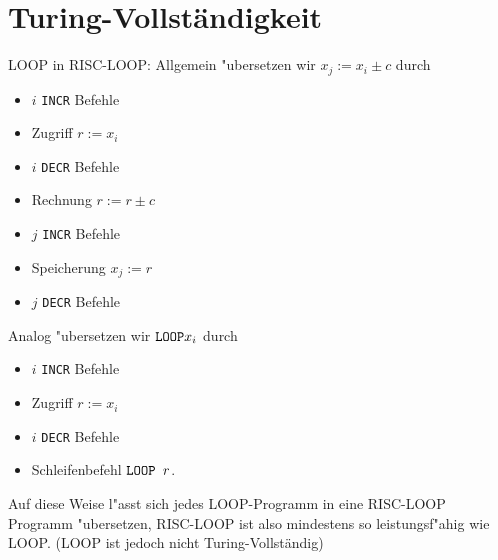 \section*{Turing-Vollständigkeit}
LOOP in RISC-LOOP: Allgemein "ubersetzen wir $x_j:=x_i\pm c$ durch
\begin{itemize}
\item $i$ {\tt INCR} Befehle
\item Zugriff $r:=x_i$
\item $i$ {\tt DECR} Befehle
\item Rechnung $r:=r\pm c$
\item $j$ {\tt INCR} Befehle

\item Speicherung $x_j:=r$
\item $j$ {\tt DECR} Befehle
\end{itemize}
Analog "ubersetzen wir $\text{\tt LOOP} x_i$ durch
\begin{itemize}
\item $i$ {\tt INCR} Befehle
\item Zugriff $r:=x_i$
\item $i$ {\tt DECR} Befehle
\item Schleifenbefehl $\text{\tt LOOP }r$.
\end{itemize}
Auf diese Weise l"asst sich jedes LOOP-Programm in eine RISC-LOOP Programm
"ubersetzen, RISC-LOOP ist also mindestens so leistungsf"ahig wie LOOP. (LOOP ist jedoch nicht Turing-Vollständig)
